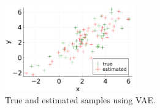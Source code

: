 \begin{example}
\begin{figure}[h]
	\centering
	\includegraphics[width=0.5\textwidth]{plots/Images/VAE_example.pdf}
	\caption{True and estimated samples using VAE.}%
	\label{fig:VAE_example}%
\end{figure}


\end{example}

